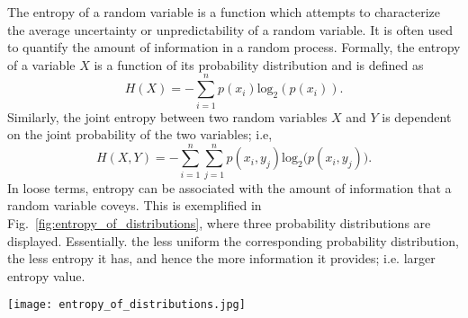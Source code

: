 The entropy of a random variable is a function which attempts to characterize
the average uncertainty or unpredictability of a random variable. It is often used to quantify the amount of information in a random process. Formally, the entropy of a variable $X$ is a function of its probability distribution and is defined as 
\begin{equation}\label{eq:entropy}
	H(X) = -\sum_{i=1}^{n}p(x_i)\text{log}_2\left(p\left(x_i\right)\right).
\end{equation}
Similarly, the joint entropy between two random variables $ X $ and $ Y $ is dependent on the joint probability of the two variables; i.e,
\begin{equation}\label{eq:joint_entropy}
	H(X,Y) = -\sum_{i=1}^{n}\sum_{j=1}^{n} p(x_i,y_j)\text{log}_2\big(p\left(x_i,y_j\right)\big).
\end{equation}
In loose terms, entropy can be associated with the amount of information that a random variable coveys. This is exemplified in Fig.~\ref{fig:entropy_of_distributions}, where three probability distributions are displayed. Essentially. the less uniform the corresponding probability distribution, the less entropy it has, and hence the more information it provides; i.e. larger entropy value. 
\begin{figure*}[!t]
	\centering	
	\hspace*{\fill}
	\texttt{[image: entropy\_of\_distributions.jpg]}
	\hspace*{\fill}	
	\caption[] {\label{fig:entropy_of_distributions}\textbf{Entropy of three example distributions.} The closer the distributions resemble a uniform distribution, the more information they contain. Image taken from \cite{Timme2018tutorialinformationtheory}.}
\end{figure*}


